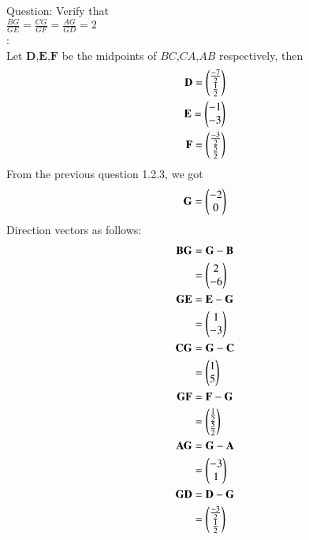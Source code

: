 \documentclass[journal,12pt,onecolumn]{IEEEtran}
\theoremstyle{remark}
\begin{document}
\let\vec\mathbf




\vspace{3cm}



\bigskip

\renewcommand{\thefigure}{\theenumi}
\renewcommand{\thetable}{\theenumi}
Question: Verify that\\
$\frac{BG}{GE}=\frac{CG}{GF}=\frac{AG}{GD}=2$\\
\solution:\\
Let $\vec{D}$,$\vec{E}$,$\vec{F}$ be the midpoints of $BC$,$CA$,$AB$ respectively, then
\begin{align}
\vec{D} = \myvec{\frac{-7}{2}\\\frac{1}{2}}\\
\vec{E} = \myvec{-1\\-3}\\
\vec{F} = \myvec{\frac{-3}{2}\\\frac{5}{2}}
\end{align}
From the previous question 1.2.3, we got
\begin{align}
\vec{G}=\myvec{-2\\0}
\end{align}
Direction vectors as follows: \\
\begin{align}
\vec{B}\vec{G}&=\vec{G}-\vec{B}\\
              &=\myvec{2\\-6}\\
\vec{G}\vec{E}&=\vec{E}-\vec{G}\\
              &=\myvec{1\\-3}\\
\vec{C}\vec{G}&=\vec{G}-\vec{C}\\
              &=\myvec{1\\5}\\
\vec{G}\vec{F}&=\vec{F}-\vec{G}\\
              &=\myvec{\frac{1}{2}\\\frac{5}{2}}\\
\vec{A}\vec{G}&=\vec{G}-\vec{A}\\
              &=\myvec{-3\\1}\\
\vec{G}\vec{D}&=\vec{D}-\vec{G}\\
              &=\myvec{\frac{-3}{2}\\\frac{1}{2}}
\end{align}
\end{document}
